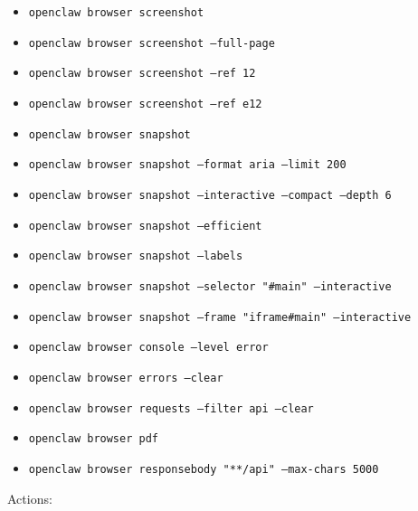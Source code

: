 \begin{itemize}
  \item \texttt{openclaw browser screenshot}
  \item \texttt{openclaw browser screenshot --full-page}
  \item \texttt{openclaw browser screenshot --ref 12}
  \item \texttt{openclaw browser screenshot --ref e12}
  \item \texttt{openclaw browser snapshot}
  \item \texttt{openclaw browser snapshot --format aria --limit 200}
  \item \texttt{openclaw browser snapshot --interactive --compact --depth 6}
  \item \texttt{openclaw browser snapshot --efficient}
  \item \texttt{openclaw browser snapshot --labels}
  \item \texttt{openclaw browser snapshot --selector "\#main" --interactive}
  \item \texttt{openclaw browser snapshot --frame "iframe\#main" --interactive}
  \item \texttt{openclaw browser console --level error}
  \item \texttt{openclaw browser errors --clear}
  \item \texttt{openclaw browser requests --filter api --clear}
  \item \texttt{openclaw browser pdf}
  \item \texttt{openclaw browser responsebody "**/api" --max-chars 5000}
\end{itemize}


Actions:

